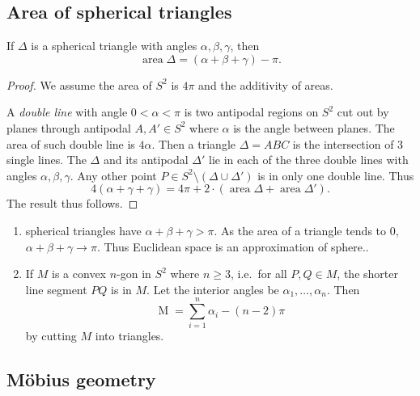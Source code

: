 \documentclass[a4paper]{article}
\theoremstyle{definition}
\begin{document}
\subsection{Area of spherical triangles}

\begin{proposition}
  If \(\Delta\) is a spherical triangle with angles \(\alpha, \beta, \gamma\), then
  \[
    \operatorname{area} \Delta = (\alpha + \beta + \gamma) - \pi.
  \]
\end{proposition}

\begin{proof}
  We assume the area of \(S^2\) is \(4\pi\) and the additivity of areas.

  A \emph{double line} with angle \(0 < \alpha < \pi\) is two antipodal regions on \(S^2\) cut out by planes through antipodal \(A, A' \in S^2\) where \(\alpha\) is the angle between planes. The area of such double line is \(4\alpha\). Then a triangle \(\Delta = ABC\) is the intersection of 3 single lines. The \(\Delta\) and its antipodal \(\Delta'\) lie in each of the three double lines with angles \(\alpha, \beta, \gamma\). Any other point \(P \in S^2 \setminus (\Delta \cup \Delta')\) is in only one double line. Thus
  \[
    4(\alpha + \gamma + \gamma) = 4\pi + 2 \cdot (\operatorname{area}\Delta + \operatorname{area}\Delta').
  \]
  The result thus follows.
\end{proof}

\begin{remark}\leavevmode
  \begin{enumerate}
  \item spherical triangles have \(\alpha + \beta + \gamma > \pi\). As the area of a triangle tends to \(0\), \(\alpha + \beta + \gamma \to \pi\). Thus Euclidean space is an approximation of sphere..
  \item If \(M\) is a convex \(n\)-gon in \(S^2\) where \(n \geq 3\), i.e.\ for all \(P, Q \in M\), the shorter line segment \(PQ\) is in \(M\). Let the interior angles be \(\alpha_1, \dots, \alpha_n\). Then
    \[
      \operatorname M = \sum_{i = 1}^n \alpha_i - (n - 2)\pi
    \]
    by cutting \(M\) into triangles.
  \end{enumerate}
\end{remark}

\subsection{Möbius geometry}
\end{document}
